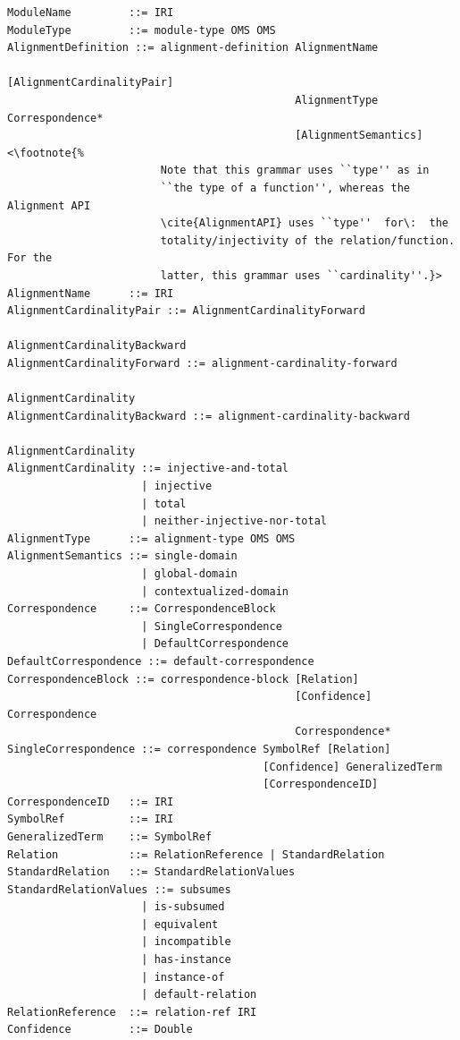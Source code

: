 \documentclass[10pt,fleqn,final]{scrreprt}
\newenvironment{definitions}[0]{\medskip }{}
\begin{document}
\begin{definitions}
\begin{lstlisting}[language=ebnf,escapeinside={<>},mathescape]
ModuleName         ::= IRI
ModuleType         ::= module-type OMS OMS
AlignmentDefinition ::= alignment-definition AlignmentName
                                             [AlignmentCardinalityPair]
                                             AlignmentType Correspondence*
                                             [AlignmentSemantics]<\footnote{%
                        Note that this grammar uses ``type'' as in
                        ``the type of a function'', whereas the Alignment API
                        \cite{AlignmentAPI} uses ``type''  for\:  the
                        totality/injectivity of the relation/function.  For the
                        latter, this grammar uses ``cardinality''.}>
AlignmentName      ::= IRI
AlignmentCardinalityPair ::= AlignmentCardinalityForward
                                                         AlignmentCardinalityBackward
AlignmentCardinalityForward ::= alignment-cardinality-forward
                                                              AlignmentCardinality
AlignmentCardinalityBackward ::= alignment-cardinality-backward
                                                                AlignmentCardinality
AlignmentCardinality ::= injective-and-total
                     | injective
                     | total
                     | neither-injective-nor-total
AlignmentType      ::= alignment-type OMS OMS
AlignmentSemantics ::= single-domain
                     | global-domain
                     | contextualized-domain
Correspondence     ::= CorrespondenceBlock
                     | SingleCorrespondence
                     | DefaultCorrespondence
DefaultCorrespondence ::= default-correspondence
CorrespondenceBlock ::= correspondence-block [Relation]
                                             [Confidence] Correspondence
                                             Correspondence*
SingleCorrespondence ::= correspondence SymbolRef [Relation]
                                        [Confidence] GeneralizedTerm
                                        [CorrespondenceID]
CorrespondenceID   ::= IRI
SymbolRef          ::= IRI
GeneralizedTerm    ::= SymbolRef
Relation           ::= RelationReference | StandardRelation
StandardRelation   ::= StandardRelationValues
StandardRelationValues ::= subsumes
                     | is-subsumed
                     | equivalent
                     | incompatible
                     | has-instance
                     | instance-of
                     | default-relation
RelationReference  ::= relation-ref IRI
Confidence         ::= Double
\end{lstlisting}


\end{definitions}
\end{document}
